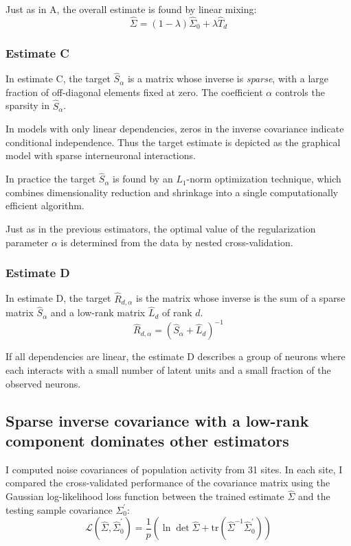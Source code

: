 Just as in A, the overall estimate is found by linear mixing:
\begin{equation}
\hat\Sigma = (1-\lambda)\hat\Sigma_0 + \lambda\hat T_d
\end{equation}

\subsubsection*{Estimate C}
In estimate C, the target $ \hat S_\alpha$ is a matrix whose inverse is \emph{sparse}, with a large fraction of off-diagonal elements fixed at zero. The coefficient $ \alpha$ controls the sparsity in $ \hat S_\alpha$.

In models with only linear dependencies, zeros in the inverse covariance indicate conditional independence. Thus the target estimate is depicted as the graphical model with sparse interneuronal interactions.

In practice the target $\hat S_\alpha$ is found by an $ L_1$-norm optimization technique, which combines dimensionality reduction and shrinkage into a single computationally efficient algorithm.

Just as in the previous estimators, the optimal value of the regularization parameter $ \alpha$ is determined from the data by nested cross-validation.

\subsubsection*{Estimate D}
In estimate D, the target $\hat R_{d,\alpha}$ is the matrix whose inverse is the sum of a sparse matrix $\hat S_\alpha$ and a low-rank matrix $\hat L_d$ of rank $d$.
\begin{equation}
\hat R_{d,\alpha} = (\hat S_\alpha + \hat L_d)^{-1}
\end{equation}

If all dependencies are linear, the estimate D describes a group of neurons where each interacts with a small number of latent units and a small fraction of the observed neurons. 

\subsection*{Sparse inverse covariance with a low-rank component dominates other estimators}
I computed noise covariances of population activity from 31 sites.  In each site, I compared the cross-validated performance of the covariance matrix using the Gaussian log-likelihood loss function between the trained estimate $ \hat\Sigma$ and the testing sample covariance $ \Sigma_0^\prime$:
\begin{equation}
\mathcal L(\hat\Sigma,\hat\Sigma_0^\prime) = 
\frac 1 p\left( \ln \det \hat \Sigma + \mbox{tr}(\hat \Sigma^{-1}\hat\Sigma_0^\prime) \right) 
\end{equation}

